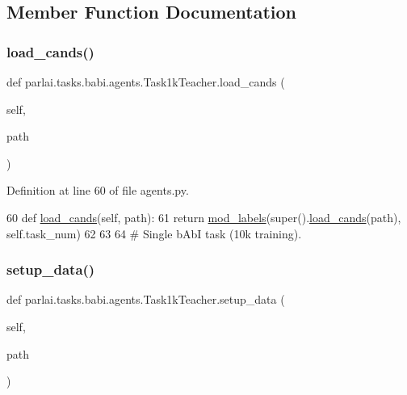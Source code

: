 \subsection{Member Function Documentation}
\mbox{\label{classparlai_1_1tasks_1_1babi_1_1agents_1_1Task1kTeacher_a23edda520c74d1b34de50e3c8994c2f1}} 
\subsubsection{\texorpdfstring{load\+\_\+cands()}{load\_cands()}}
{\footnotesize\ttfamily def parlai.\+tasks.\+babi.\+agents.\+Task1k\+Teacher.\+load\+\_\+cands (\begin{DoxyParamCaption}\item[{}]{self,  }\item[{}]{path }\end{DoxyParamCaption})}



Definition at line 60 of file agents.\+py.


\begin{DoxyCode}
60     \textcolor{keyword}{def }\hyperlink{namespaceparlai_1_1utils_1_1misc_ad935ab0a9d49b897c5e3efdbe1c46c4d}{load\_cands}(self, path):
61         \textcolor{keywordflow}{return} \hyperlink{namespaceparlai_1_1tasks_1_1babi_1_1agents_a80ee701751bc608fcb01bcfb1e884de0}{mod\_labels}(super().\hyperlink{namespaceparlai_1_1utils_1_1misc_ad935ab0a9d49b897c5e3efdbe1c46c4d}{load\_cands}(path), self.task\_num)
62 
63 
64 \textcolor{comment}{# Single bAbI task (10k training).}
\end{DoxyCode}
\mbox{\label{classparlai_1_1tasks_1_1babi_1_1agents_1_1Task1kTeacher_a191f80b829fd3103238317eed2cad03e}} 
\subsubsection{\texorpdfstring{setup\+\_\+data()}{setup\_data()}}
{\footnotesize\ttfamily def parlai.\+tasks.\+babi.\+agents.\+Task1k\+Teacher.\+setup\+\_\+data (\begin{DoxyParamCaption}\item[{}]{self,  }\item[{}]{path }\end{DoxyParamCaption})}



